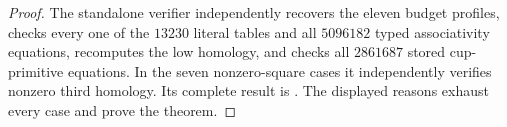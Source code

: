 \begin{proof}
The standalone verifier 
independently recovers the eleven budget profiles, checks every
one of the $13230$ literal tables and all $5096182$ typed
associativity equations, recomputes the low homology, and checks
all $2861687$ stored cup-primitive equations. In the seven
nonzero-square cases it independently verifies nonzero third
homology. Its complete result is
.
The displayed reasons exhaust every case and prove the theorem.
\end{proof}
